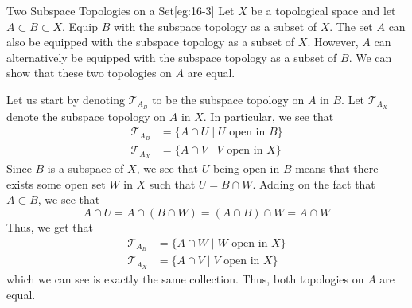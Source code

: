 \begin{egBox}{Two Subspace Topologies on a Set}[eg:16-3]
    Let \( X \) be a topological space and let \( A \subset B \subset X \).
    Equip \( B \) with the subspace topology as a subset of \( X \).
    The set \( A \) can also be equipped with the subspace topology as a subset
    of \( X \).
    However, \( A \) can alternatively be equipped with the subspace topology 
    as a subset of \( B \).
    We can show that these two topologies on \( A \) are equal.

    \baseSkip 

    Let us start by denoting \( \mathcal{T}_{ A_{ B } } \) to be the subspace 
    topology on \( A \) in \( B \).
    Let \( \mathcal{T}_{ A_{ X } } \) denote the subspace topology on 
    \( A \) in \( X \).
    In particular, we see that 
    \begin{equation*}
        \begin{aligned}
            \mathcal{T}_{ A_{ B } }
            &=
            \{
                A \cap U \mid U \text{ open in } B
            \}
            \\
            \mathcal{T}_{ A_{ X } }
            &=
            \{
                A \cap V \mid V \text{ open in } X
            \}
        \end{aligned}
    \end{equation*}
    Since \( B \) is a subspace of \( X \), we see that \( U \) being open in 
    \( B \) means that there exists some open set \( W \) in \( X \) such that 
    \( U = B \cap W \).
    Adding on the fact that \( A \subset B \), we see that 
    \begin{equation*}
        A \cap U
        =
        A \cap ( B \cap W )
        =
        ( A \cap B ) \cap W
        =
        A \cap W
    \end{equation*}
    Thus, we get that 
    \begin{equation*}
        \begin{aligned}
            \mathcal{T}_{ A_{ B } }
            &=
            \{
                A \cap W \mid W \text{ open in } X
            \}
            \\
            \mathcal{T}_{ A_{ X } }
            &=
            \{
                A \cap V \mid V \text{ open in } X
            \}
        \end{aligned}
    \end{equation*}
    which we can see is exactly the same collection.
    Thus, both topologies on \( A \) are equal.
\end{egBox}

